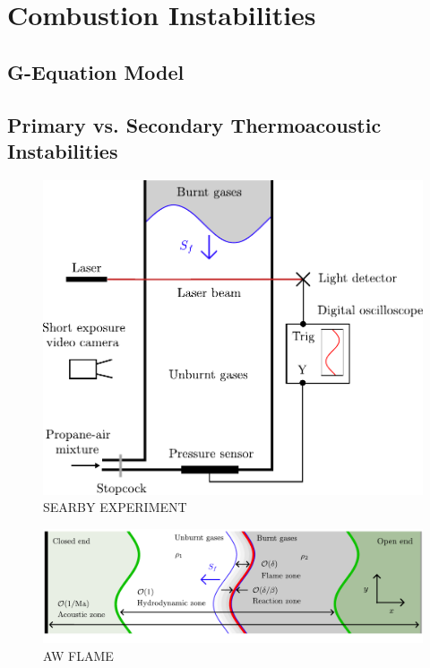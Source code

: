 \section{Combustion Instabilities}


\subsection{G-Equation Model}




\subsection{Primary vs. Secondary Thermoacoustic Instabilities}


\begin{figure}[t]
\centering
\includegraphics[scale=0.6]{assets/imgs/Searby-92.pdf}
\caption{SEARBY EXPERIMENT}
\label{fig:searby-experiment}
\end{figure}

\begin{figure}[t]
\centering
\includegraphics[scale=0.6]{assets/imgs/AW-flame.pdf}
\caption{AW FLAME}
\label{fig:AW-flame}
\end{figure}
    
